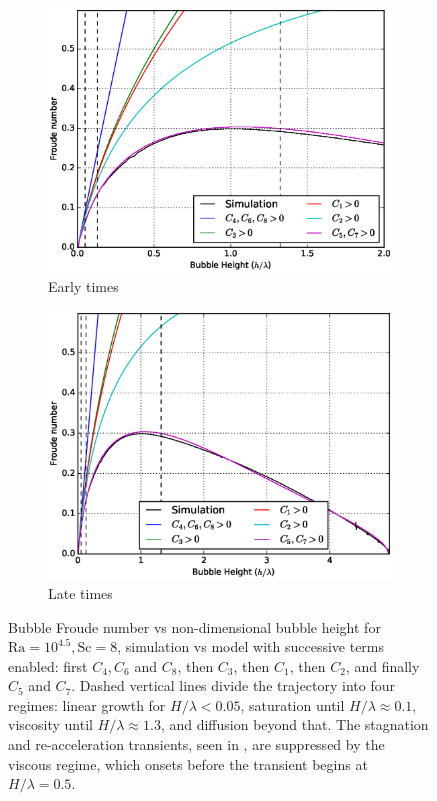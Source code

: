 \begin{figure}
\begin{subfigure}[b]{0.5\textwidth}
\includegraphics[width=\textwidth]{figs/Cascade-short-32-4}
\caption{Early times}
\end{subfigure}
\begin{subfigure}[b]{0.5\textwidth}
\includegraphics[width=\textwidth]{figs/Cascade-32-4}
\caption{Late times}
\end{subfigure}
\caption{ 
Bubble Froude number vs non-dimensional bubble height for $\text{Ra} = 10^{4.5}, \text{Sc} = 8$, simulation vs model with successive terms enabled: first $C_4, C_6$ and $C_8$, then $C_3$, then $C_1$, then $C_2$, and finally $C_5$ and $C_7$.
Dashed vertical lines divide the trajectory into four regimes: linear growth for $H/\lambda < 0.05$, saturation until $H / \lambda \approx 0.1$, viscosity until $H / \lambda \approx 1.3$, and diffusion beyond that.
The stagnation and re-acceleration transients, seen in , are suppressed by the viscous regime, which onsets before the transient begins at $H / \lambda = 0.5$.
}
\end{figure}


